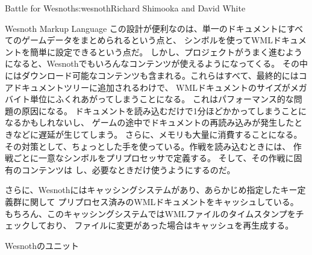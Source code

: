 \begin{aosachapter}{Battle for Wesnoth}{s:wesnoth}{Richard Shimooka and David White}
\begin{aosasect1}{Wesnoth Markup Language}
この設計が便利なのは、単一のドキュメントにすべてのゲームデータをまとめられるという点と、
シンボルを使ってWMLドキュメントを簡単に設定できるという点だ。
しかし、プロジェクトがうまく進むようになると、Wesnothでもいろんなコンテンツが使えるようになってくる。
その中にはダウンロード可能なコンテンツも含まれる。これらはすべて、最終的にはコアドキュメントツリーに追加されるわけで、
WMLドキュメントのサイズがメガバイト単位にふくれあがってしまうことになる。
これはパフォーマンス的な問題の原因になる。
ドキュメントを読み込むだけで1分ほどかかってしまうことになるかもしれないし、
ゲームの途中でドキュメントの再読み込みが発生したときなどに遅延が生じてしまう。
さらに、メモリも大量に消費することになる。
その対策として、ちょっとした手を使っている。作戦を読み込むときには、
作戦ごとに一意なシンボルをプリプロセッサで定義する。
そして、その作戦に固有のコンテンツは
し、必要なときだけ使うようにするのだ。

さらに、Wesnothにはキャッシングシステムがあり、あらかじめ指定したキー定義群に関して
プリプロセス済みのWMLドキュメントをキャッシュしている。
もちろん、このキャッシングシステムではWMLファイルのタイムスタンプをチェックしており、
ファイルに変更があった場合はキャッシュを再生成する。

\end{aosasect1}

\begin{aosasect1}{Wesnothのユニット}


\end{aosasect1}
\end{aosachapter}
